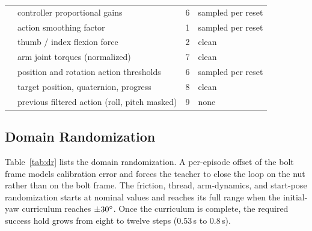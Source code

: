 \begin{table}[!htbp]
\begin{tabularx}{\textwidth}{lYcY}
         & controller proportional gains & 6 & sampled per reset \\
         & action smoothing factor & 1 & sampled per reset \\
         & thumb / index flexion force & 2 & clean \\
         & arm joint torques (normalized) & 7 & clean \\
         & position and rotation action thresholds & 6 & sampled per reset \\
         & target position, quaternion, progress & 8 & clean \\
         & previous filtered action (roll, pitch masked) & 9 & none \\
        \bottomrule
    \end{tabularx}
\end{table}%

\subsection{Domain Randomization}\label{sec:app-dr}

Table~\ref{tab:dr} lists the domain randomization. A per-episode offset of the bolt frame models calibration error and forces the teacher to close the loop on the nut rather than on the bolt frame. The friction, thread, arm-dynamics, and start-pose randomization starts at nominal values and reaches its full range when the initial-yaw curriculum reaches $\pm30^\circ$. Once the curriculum is complete, the required success hold grows from eight to twelve steps (0.53\,s to 0.8\,s).

